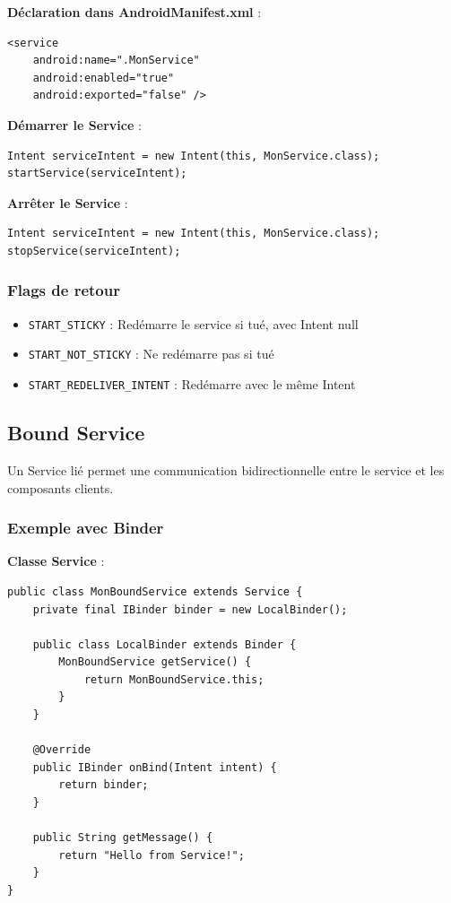 \documentclass[11pt,a4paper]{article}
\begin{document}
\textbf{Déclaration dans AndroidManifest.xml} :
\begin{lstlisting}[style=XML]
<service
    android:name=".MonService"
    android:enabled="true"
    android:exported="false" />
\end{lstlisting}

\textbf{Démarrer le Service} :
\begin{lstlisting}
Intent serviceIntent = new Intent(this, MonService.class);
startService(serviceIntent);
\end{lstlisting}

\textbf{Arrêter le Service} :
\begin{lstlisting}
Intent serviceIntent = new Intent(this, MonService.class);
stopService(serviceIntent);
\end{lstlisting}

\subsubsection{Flags de retour}

\begin{itemize}
    \item \texttt{START\_STICKY} : Redémarre le service si tué, avec Intent null
    \item \texttt{START\_NOT\_STICKY} : Ne redémarre pas si tué
    \item \texttt{START\_REDELIVER\_INTENT} : Redémarre avec le même Intent
\end{itemize}

\subsection{Bound Service}

Un Service lié permet une communication bidirectionnelle entre le service et les composants clients.

\subsubsection{Exemple avec Binder}

\textbf{Classe Service} :
\begin{lstlisting}
public class MonBoundService extends Service {
    private final IBinder binder = new LocalBinder();
    
    public class LocalBinder extends Binder {
        MonBoundService getService() {
            return MonBoundService.this;
        }
    }
    
    @Override
    public IBinder onBind(Intent intent) {
        return binder;
    }
    
    public String getMessage() {
        return "Hello from Service!";
    }
}
\end{lstlisting}
\end{document}
